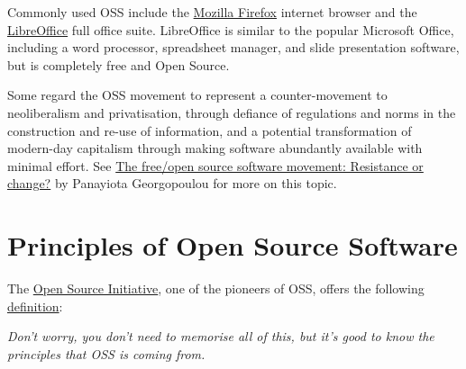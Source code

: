 \documentclass[]{book}
\begin{document}
Commonly used OSS include the \href{https://www.mozilla.org/en-US/firefox/}{Mozilla Firefox} internet browser and the \href{https://www.libreoffice.org/}{LibreOffice} full office suite. LibreOffice is similar to the popular Microsoft Office, including a word processor, spreadsheet manager, and slide presentation software, but is completely free and Open Source.

Some regard the OSS movement to represent a counter-movement to neoliberalism and privatisation, through defiance of regulations and norms in the construction and re-use of information, and a potential transformation of modern-day capitalism through making software abundantly available with minimal effort. See \href{http://www.redalyc.org/html/742/74212712006/}{The free/open source software movement: Resistance or change?} by Panayiota Georgopoulou for more on this topic.

\hypertarget{principles-of-open-source-software}{%
\section{Principles of Open Source Software }\label{principles-of-open-source-software}}

The \href{https://opensource.org/}{Open Source Initiative}, one of the pioneers of OSS, offers the following \href{https://en.wikipedia.org/wiki/The_Open_Source_Definition\#Definition}{definition}:

\emph{Don't worry, you don't need to memorise all of this, but it's good to know the principles that OSS is coming from.}
\end{document}
